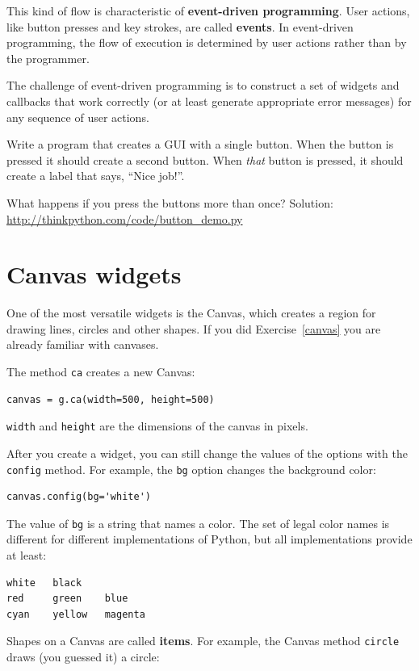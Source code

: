 \documentclass[10pt]{book}
\begin{document}
This kind of flow is characteristic of {\bf event-driven programming}.
User actions, like button presses and key strokes, are called {\bf
events}.  In event-driven programming, the flow of execution is
determined by user actions rather than by the programmer.  

The challenge of event-driven programming is to construct a set of
widgets and callbacks that work correctly (or at least generate
appropriate error messages) for any sequence of user actions.

\begin{exercise}

Write a program that creates a GUI with a single button.  When the
button is pressed it should create a second button.  When
{\em that} button is pressed, it should create a label that
says, ``Nice job!''.

What happens if you press the buttons more than once?
Solution: \url{http://thinkpython.com/code/button_demo.py}

\end{exercise}


\section{Canvas widgets}

One of the most versatile widgets is the Canvas, which creates
a region for drawing lines, circles and other shapes.  If you
did Exercise~\ref{canvas} you are already familiar with canvases.

The method {\tt ca} creates a new Canvas:

\begin{verbatim}
canvas = g.ca(width=500, height=500)
\end{verbatim}
%
{\tt width} and {\tt height} are the dimensions of the canvas
in pixels.  

After you create a widget, you can still change the values of
the options with the
{\tt config} method.  For example, the {\tt bg} option changes
the background color:

\begin{verbatim}
canvas.config(bg='white')
\end{verbatim}
%
The value of {\tt bg} is a string
that names a color.  The set of legal color names is different
for different implementations of Python, but all implementations
provide at least:

\begin{verbatim}
white   black
red     green    blue   
cyan    yellow   magenta
\end{verbatim}
%
Shapes on a Canvas are called {\bf items}.  For example,
the Canvas method {\tt circle} draws (you guessed it) a circle:
\end{document}
